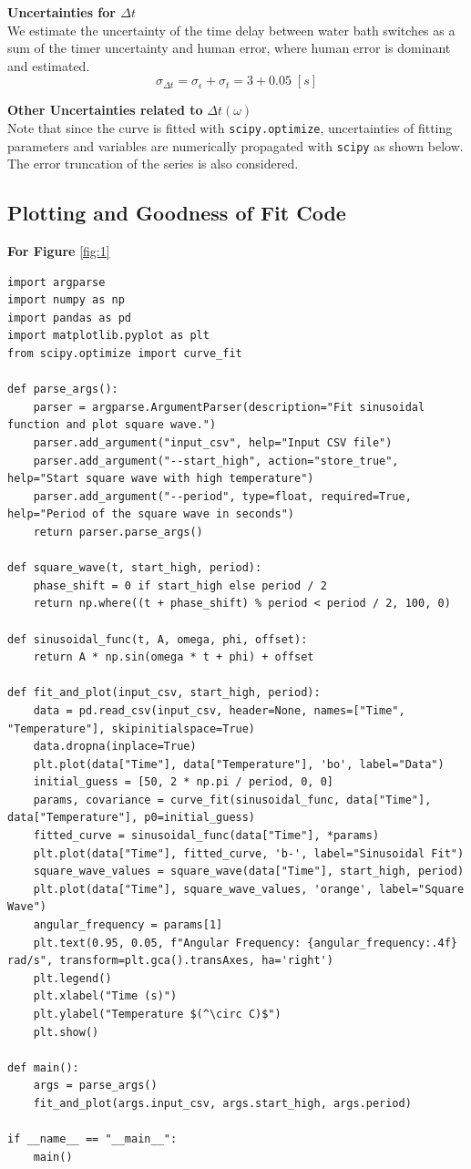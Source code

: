 \documentclass[12pt]{article}
\begin{document}
\textbf{Uncertainties for $\Delta t$}\\
We estimate the uncertainty of the time delay between water bath switches as a sum of the timer uncertainty and human error, where human error is dominant and estimated.
$$\sigma_{\Delta t}=\sigma_\epsilon+\sigma_t=3+0.05\;[s]$$

\textbf{Other Uncertainties related to }$\Delta t(\omega)$\\
Note that since the curve is fitted with \texttt{scipy.optimize}, uncertainties of fitting parameters and variables are numerically propagated with \texttt{scipy} as shown below. The error truncation of the series is also considered.

\newpage
\subsection*{Plotting and Goodness of Fit Code}
\textbf{For Figure }\ref{fig:1}
\begin{lstlisting}
import argparse
import numpy as np
import pandas as pd
import matplotlib.pyplot as plt
from scipy.optimize import curve_fit

def parse_args():
    parser = argparse.ArgumentParser(description="Fit sinusoidal function and plot square wave.")
    parser.add_argument("input_csv", help="Input CSV file")
    parser.add_argument("--start_high", action="store_true", help="Start square wave with high temperature")
    parser.add_argument("--period", type=float, required=True, help="Period of the square wave in seconds")
    return parser.parse_args()

def square_wave(t, start_high, period):
    phase_shift = 0 if start_high else period / 2
    return np.where((t + phase_shift) % period < period / 2, 100, 0)

def sinusoidal_func(t, A, omega, phi, offset):
    return A * np.sin(omega * t + phi) + offset

def fit_and_plot(input_csv, start_high, period):
    data = pd.read_csv(input_csv, header=None, names=["Time", "Temperature"], skipinitialspace=True)
    data.dropna(inplace=True)
    plt.plot(data["Time"], data["Temperature"], 'bo', label="Data")
    initial_guess = [50, 2 * np.pi / period, 0, 0]
    params, covariance = curve_fit(sinusoidal_func, data["Time"], data["Temperature"], p0=initial_guess)
    fitted_curve = sinusoidal_func(data["Time"], *params)
    plt.plot(data["Time"], fitted_curve, 'b-', label="Sinusoidal Fit")
    square_wave_values = square_wave(data["Time"], start_high, period)
    plt.plot(data["Time"], square_wave_values, 'orange', label="Square Wave")
    angular_frequency = params[1]
    plt.text(0.95, 0.05, f"Angular Frequency: {angular_frequency:.4f} rad/s", transform=plt.gca().transAxes, ha='right')
    plt.legend()
    plt.xlabel("Time (s)")
    plt.ylabel("Temperature $(^\circ C)$")
    plt.show()

def main():
    args = parse_args()
    fit_and_plot(args.input_csv, args.start_high, args.period)

if __name__ == "__main__":
    main()
\end{lstlisting}
\end{document}
